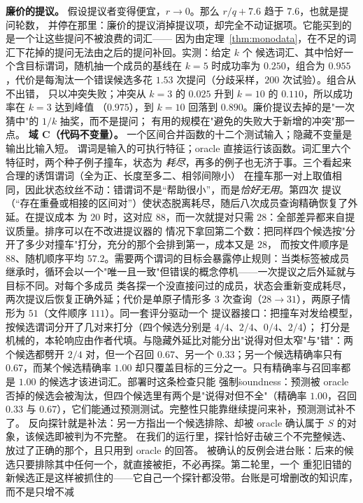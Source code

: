 \documentclass[11pt]{ctexart}
\begin{document}
\textbf{廉价的提议。} 假设提议者变得便宜，$r \to 0$。那么 $r/q + 7.6$ 趋于 $7.6$，也就是提问轮数，
并停在那里：廉价的提议消掉提议项，却完全不动证据项。它能买到的是一个让这些提问不被浪费的词汇——
因为由定理~\ref{thm:monodata}，在不足的词汇下花掉的提问无法由之后的提问补回。实测：给定 $k$ 个
候选词汇、其中恰好一个含目标谓词，随机抽一个成员的基线在 $k=5$ 时成功率为 $0.250$，组合为
$0.955$，代价是每淘汰一个错误候选多花 $1.53$ 次提问（分歧采样，$200$ 次试验）。组合从不出错，
只以冲突失败；冲突从 $k=3$ 的 $0.025$ 升到 $k=10$ 的 $0.110$，所以成功率在 $k=3$ 达到峰值
（$0.975$），到 $k=10$ 回落到 $0.890$。廉价提议去掉的是"一次猜中"的 $1/k$ 抽奖，而不是提问；
有用的规模在"避免的失败大于新增的冲突"那一点。
\textbf{域 C（代码不变量）。} 一个区间合并函数的十二个测试输入；隐藏不变量是输出比输入短。
谓词是输入的可执行特征；oracle 直接运行该函数。词汇里六个特征时，两个种子例子撞车，状态为
\emph{耗尽}，再多的例子也无济于事。三个看起来合理的诱饵谓词（全为正、长度至多二、相邻间隙小）
在撞车那一对上取值相同，因此状态纹丝不动：错谓词不是“帮助很小”，而是\emph{恰好无用}。第四次
提议（“存在重叠或相接的区间对”）使状态脱离耗尽，随后八次成员查询精确恢复了外延。在提议成本
为 $20$ 时，这对应 $88$，而一次就提对只需 $28$：全部差异都来自提议质量。排序可以在不改进提议器的
情况下拿回第二个数：把同样四个候选按"分开了多少对撞车"打分，充分的那个会排到第一，成本又是 $28$，
而按文件顺序是 $88$、随机顺序平均 $57.2$。需要两个谓词的目标会暴露停止规则：当类标签被成员
继承时，循环会以一个"唯一且一致"但错误的概念停机——一次提议之后外延就与目标不同。对每个多成员
类各探一个没直接问过的成员，状态会重新变成耗尽，两次提议后恢复正确外延；代价是单原子情形多 $3$
次查询（$28 \to 31$），两原子情形为 $51$（文件顺序 $111$）。同一套评分驱动一个
提议器接口：把撞车对发给模型，按候选谓词分开了几对来打分（四个候选分别是 $4/4$、$2/4$、$0/4$、$2/4$）；
打分是机械的，本轮响应由作者代填。与隐藏外延比对能分出"说得对但太窄"与"错"：两个候选都劈开
$2/4$ 对，但一个召回 $0.67$、另一个 $0.33$；另一个候选精确率只有 $0.67$，而某个候选精确率
$1.00$ 却只覆盖目标的三分之一。只有精确率与召回率都是 $1.00$ 的候选才该进词汇。部署时这条检查只能
强制\.soundness：预测被 oracle 否掉的候选会被淘汰，但四个候选里有两个是"说得对但不全"（精确率
$1.00$，召回 $0.33$ 与 $0.67$），它们能通过预测测试。完整性只能靠继续提问来补，预测测试补不了。
反向探针就是补法：另一方指出一个候选排除、却被 oracle 确认属于 $S$ 的对象，该候选即被判为不完整。
在我们的运行里，探针恰好击破三个不完整候选、放过了正确的那个，且只用到 oracle 的回答。
被确认的反例会进台账：后来的候选只要排除其中任何一个，就直接被拒，不必再探。第二轮里，一个
重犯旧错的新候选正是这样被抓住的——它自己一个探针都没带。台账是可增删改的知识库，而不是只增不减
\end{document}

